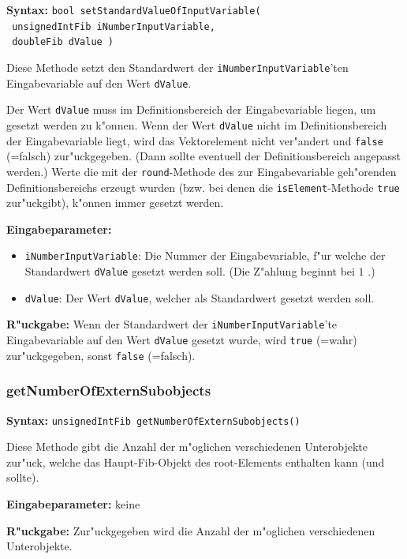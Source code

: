 \textbf{Syntax:} \verb|bool setStandardValueOfInputVariable(| \\\verb| unsignedIntFib iNumberInputVariable,| \\\verb| doubleFib dValue )|

\bigskip\noindent
Diese Methode setzt den Standardwert der \verb|iNumberInputVariable|'ten Eingabevariable auf den Wert \verb|dValue|.

Der Wert \verb|dValue| muss im Definitionsbereich der Eingabevariable liegen, um gesetzt werden zu k"onnen. Wenn der Wert \verb|dValue| nicht im Definitionsbereich der Eingabevariable liegt, wird das Vektorelement nicht ver"andert und \verb|false| (=falsch) zur"uckgegeben. (Dann sollte eventuell der Definitionsbereich angepasst werden.) Werte die mit der \verb|round|-Methode des zur Eingabevariable geh"orenden Definitionsbereichs erzeugt wurden (bzw. bei denen die \verb|isElement|-Methode \verb|true| zur"uckgibt), k"onnen immer gesetzt werden.

\bigskip\noindent
\textbf{Eingabeparameter:}
\begin{itemize}
 \item \verb|iNumberInputVariable|: Die Nummer der Eingabevariable, f"ur welche der Standardwert \verb|dValue| gesetzt werden soll. (Die Z"ahlung beginnt bei $1$ .)
 \item \verb|dValue|: Der Wert \verb|dValue|, welcher als Standardwert gesetzt werden soll.
\end{itemize}

\bigskip\noindent
\textbf{R"uckgabe:} Wenn der Standardwert der \verb|iNumberInputVariable|'te Eingabevariable auf den Wert \verb|dValue| gesetzt wurde, wird \verb|true| (=wahr) zur"uckgegeben, sonst \verb|false| (=falsch).


\subsubsection{getNumberOfExternSubobjects}

\textbf{Syntax:} \verb|unsignedIntFib getNumberOfExternSubobjects()|

\bigskip\noindent
Diese Methode gibt die Anzahl der m"oglichen verschiedenen Unterobjekte zur"uck, welche das Haupt-Fib-Objekt des root-Elements enthalten kann (und sollte).

\bigskip\noindent
\textbf{Eingabeparameter:} keine

\bigskip\noindent
\textbf{R"uckgabe:} Zur"uckgegeben wird die Anzahl der m"oglichen verschiedenen Unterobjekte.

